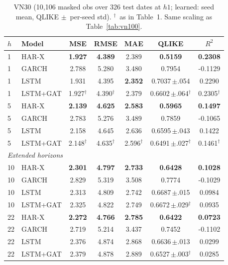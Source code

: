 \documentclass[runningheads]{llncs}
\begin{document}
\begin{table}[t]
\centering
\caption{VN30 (10{,}106 masked obs over 326 test dates at $h1$; learned: seed mean, QLIKE $\pm$~per-seed std). $^{\dagger}$~as in Table~1. Same scaling as
Table~\ref{tab:vn100}.}
\label{tab:vn30}
\footnotesize
\setlength{\tabcolsep}{5pt}
\begin{tabular}{llccccc}
\toprule
$h$ & Model & MSE & RMSE & MAE & QLIKE & $R^2$ \\
\midrule
1  & HAR-X    & \textbf{1.927} & \textbf{4.389} & 2.389 & \textbf{0.5159} & \textbf{0.2308} \\
1  & GARCH    & 2.788 & 5.280 & 3.480 & 0.7954 & -0.1129 \\
1  & LSTM     & 1.931 & 4.395 & \textbf{2.352} & 0.7037\,$\pm$.054 & 0.2290 \\
1  & LSTM+GAT & 1.927$^{\dagger}$ & 4.390$^{\dagger}$ & 2.379 & 0.6602\,$\pm$.064$^{\dagger}$ & 0.2305$^{\dagger}$ \\
\midrule
5  & HAR-X    & \textbf{2.139} & \textbf{4.625} & \textbf{2.583} & \textbf{0.5965} & \textbf{0.1497} \\
5  & GARCH    & 2.783 & 5.276 & 3.489 & 0.7859 & -0.1065 \\
5  & LSTM     & 2.158 & 4.645 & 2.636 & 0.6595\,$\pm$.043 & 0.1422 \\
5  & LSTM+GAT & 2.148$^{\dagger}$ & 4.635$^{\dagger}$ & 2.596$^{\dagger}$ & 0.6491\,$\pm$.027$^{\dagger}$ & 0.1461$^{\dagger}$ \\
\midrule
\multicolumn{7}{l}{\emph{Extended horizons}}\\
10 & HAR-X    & \textbf{2.301} & \textbf{4.797} & \textbf{2.733} & \textbf{0.6428} & \textbf{0.1028} \\
10 & GARCH    & 2.829 & 5.319 & 3.508 & 0.7774 & -0.1029 \\
10 & LSTM     & 2.313 & 4.809 & 2.742 & 0.6687\,$\pm$.015 & 0.0984 \\
10 & LSTM+GAT & 2.325 & 4.822 & 2.749 & 0.6672\,$\pm$.029$^{\dagger}$ & 0.0935 \\
\midrule
22 & HAR-X    & \textbf{2.272} & \textbf{4.766} & \textbf{2.785} & \textbf{0.6422} & \textbf{0.0723} \\
22 & GARCH    & 2.719 & 5.214 & 3.437 & 0.7452 & -0.1102 \\
22 & LSTM     & 2.376 & 4.874 & 2.868 & 0.6636\,$\pm$.013 & 0.0299 \\
22 & LSTM+GAT & 2.379 & 4.878 & 2.889 & 0.6527\,$\pm$.003$^{\dagger}$ & 0.0285 \\
\bottomrule
\end{tabular}
\end{table}
\end{document}
